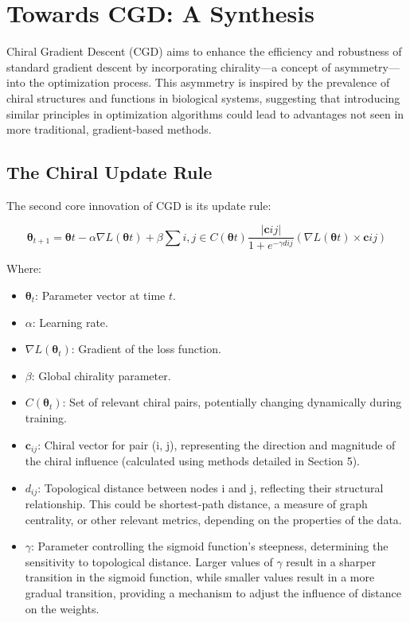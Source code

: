 \documentclass[12pt, a4paper]{article}
\begin{document}
\section{Towards CGD: A Synthesis}

Chiral Gradient Descent (CGD) aims to enhance the efficiency and robustness of standard gradient descent by incorporating chirality—a concept of asymmetry—into the optimization process. This asymmetry is inspired by the prevalence of chiral structures and functions in biological systems, suggesting that introducing similar principles in optimization algorithms could lead to advantages not seen in more traditional, gradient-based methods.

\subsection{The Chiral Update Rule}

The second core innovation of CGD is its update rule:

\begin{equation} \label{eq:cgd_sigmoid_final}
\boldsymbol{\theta}_{t+1} = \boldsymbol{\theta}t - \alpha \nabla L(\boldsymbol{\theta}t) + \beta \sum{i,j \in C(\boldsymbol{\theta}t)} \frac{| \mathbf{c}{ij} |}{1 + e^{-\gamma d{ij}}} (\nabla L(\boldsymbol{\theta}t) \times \mathbf{c}{ij})
\end{equation}

Where:

\begin{itemize}
    \item \(\boldsymbol{\theta}_t\): Parameter vector at time \(t\).
    \item \(\alpha\): Learning rate.
    \item \(\nabla L(\boldsymbol{\theta}_t)\): Gradient of the loss function.
    \item \(\beta\): Global chirality parameter.
    \item \(C(\boldsymbol{\theta}_t)\): Set of relevant chiral pairs, potentially changing dynamically during training.
    \item \(\mathbf{c}_{ij}\): Chiral vector for pair (i, j), representing the direction and magnitude of the chiral influence (calculated using methods detailed in Section 5).
    \item \(d_{ij}\): Topological distance between nodes i and j, reflecting their structural relationship. This could be shortest-path distance, a measure of graph centrality, or other relevant metrics, depending on the properties of the data.
    \item \(\gamma\): Parameter controlling the sigmoid function’s steepness, determining the sensitivity to topological distance. Larger values of \(\gamma\) result in a sharper transition in the sigmoid function, while smaller values result in a more gradual transition, providing a mechanism to adjust the influence of distance on the weights.
\end{itemize}
\end{document}
